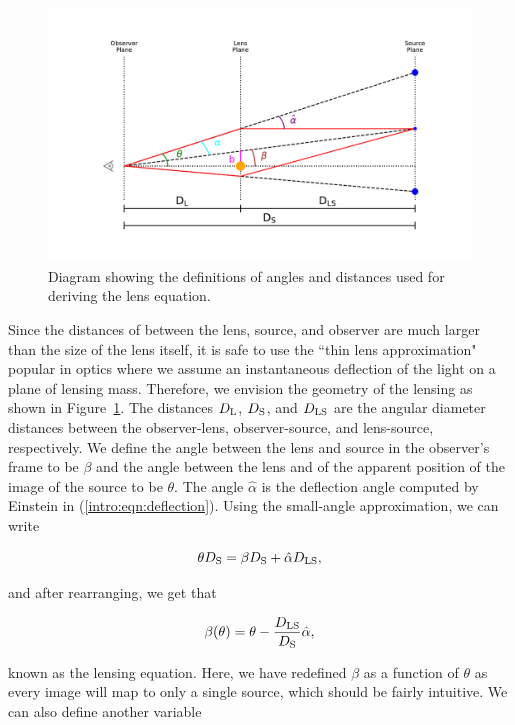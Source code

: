\begin{figure}
\includegraphics[width=\textwidth, trim=75pt 75pt 75pt 75pt]{Intro/lens_diagram.pdf}
\caption[Diagram of gravitational lensing parameters]{Diagram showing the definitions of angles and distances used for deriving the lens equation.}
\label{intro:fig:diagram}
\end{figure}

Since the distances of between the lens, source, and observer are much larger than the size of the lens itself, it is safe to use the ``thin lens approximation" popular in optics where we assume an instantaneous deflection of the light on a plane of lensing mass. Therefore, we envision the geometry of the lensing as shown in Figure~\ref{intro:fig:diagram}. The distances $D_\mathrm{L}$, $D_\mathrm{S}$, and $D_\mathrm{LS}$ are the angular diameter distances between the observer-lens, observer-source, and lens-source, respectively. We define the angle between the lens and source in the observer's frame to be $\beta$ and the angle between the lens and of the apparent position of the image of the source to be $\theta$. The angle $\hat\alpha$ is the deflection angle computed by Einstein in (\ref{intro:eqn:deflection}). Using the small-angle approximation, we can write

\begin{equation}
\theta D_\mathrm{S} = \beta D_\mathrm{S} + \hat\alpha D_\mathrm{LS},
\end{equation}

\noindent and after rearranging, we get that

\begin{equation}
\beta(\theta) = \theta - \frac{D_\mathrm{LS}}{D_\mathrm{S}} \hat\alpha,
\end{equation}

\noindent known as the lensing equation. Here, we have redefined $\beta$ as a function of $\theta$ as every image will map to only a single source, which should be fairly intuitive. We can also define another variable

